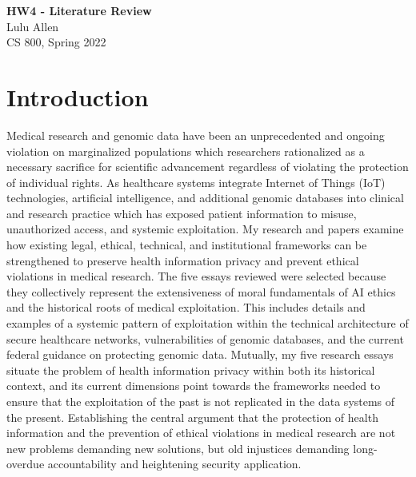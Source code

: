 \documentclass[12pt]{article}
\begin{document}
\begin{centering}
{\large\textbf{HW4 - Literature Review}}\\
\vspace{3mm} %
Lulu Allen\\
CS 800, Spring 2022\\
\end{centering} 



\section{Introduction}
Medical research and genomic data have been an unprecedented and ongoing violation on marginalized populations which researchers rationalized as a necessary sacrifice for scientific advancement regardless of violating the protection of individual rights. As healthcare systems integrate Internet of Things (IoT) technologies, artificial intelligence, and additional genomic databases into clinical and research practice which has exposed patient information to misuse, unauthorized access, and systemic exploitation. My research and papers examine how existing legal, ethical, technical, and institutional frameworks can be strengthened to preserve health information privacy and prevent ethical violations in medical research. The five essays reviewed were selected because they collectively represent the extensiveness of moral fundamentals of AI ethics and the historical roots of medical exploitation. This includes details and examples of a systemic pattern of exploitation within the technical architecture of secure healthcare networks, vulnerabilities of genomic databases, and the current federal guidance on protecting genomic data. Mutually, my five research essays situate the problem of health information privacy within both its historical context, and its current dimensions point towards the frameworks needed to ensure that the exploitation of the past is not replicated in the data systems of the present. Establishing the central argument that the protection of health information and the prevention of ethical violations in medical research are not new problems demanding new solutions, but old injustices demanding long-overdue accountability and heightening security application.
\end{document}
